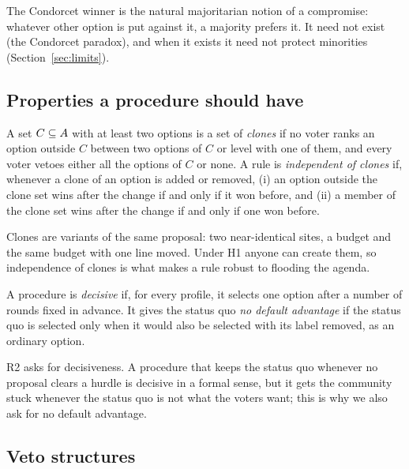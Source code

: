 The Condorcet winner is the natural majoritarian notion of a compromise: whatever other option is put
against it, a majority prefers it. It need not exist (the Condorcet paradox), and when it exists it
need not protect minorities (Section~\ref{sec:limits}).

\subsection{Properties a procedure should have}

\begin{definition}\label{def:clones}
A set $C \subseteq A$ with at least two options is a set of \emph{clones} if no voter ranks an
option outside $C$ between two options of $C$ or level with one of them, and every voter vetoes either
all the options of $C$ or none. A rule is \emph{independent of clones} if, whenever a clone of an option
is added or removed, (i) an option outside the clone set wins after the change if and only if it won
before, and (ii) a member of the clone set wins after the change if and only if one won before.
\end{definition}

Clones are variants of the same proposal: two near-identical sites, a budget and the same budget with
one line moved. Under H1 anyone can create them, so independence of clones is what makes a rule robust
to flooding the agenda.

\begin{definition}[Decisiveness]\label{def:decisive}
A procedure is \emph{decisive} if, for every profile, it selects one option after a number of rounds
fixed in advance. It gives the status quo \emph{no default advantage} if the status quo is selected only
when it would also be selected with its label removed, as an ordinary option.
\end{definition}

R2 asks for decisiveness. A procedure that keeps the status quo whenever no proposal clears a hurdle is
decisive in a formal sense, but it gets the community stuck whenever the status quo is not what the
voters want; this is why we also ask for no default advantage.

\subsection{Veto structures}

